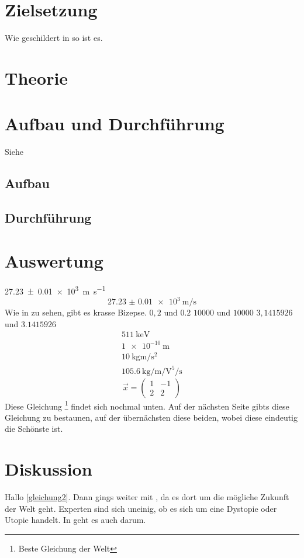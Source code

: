 \maketitle
\tableofcontents
\newpage

\section{Zielsetzung}
Wie geschildert in \cite{anleitung} so ist es.

\section{Theorie}
\section{Aufbau und Durchführung}
  Siehe
  \subsection{Aufbau}
  \subsection{Durchführung}
\newpage

\section{Auswertung}
\SI{27.23(1)e3}{\meter\per\second}
\begin{equation}
  \SI{27.23(1)e3}{\meter\per\second}
\end{equation}
Wie in \cite[4]{hallo} zu sehen, gibt es krasse Bizepse.
$0,2$ und $\num{0,2}$
$10000$ und $\num{10000}$
$3,1415926$ und $\num{3,1415926}$
\begin{gather}
  \SI{511}{\kilo\electronvolt} \\
  \SI{1e-10}{\metre} \\
  \SI{10}{\kilo\gram\meter\per\second\squared} \\
  \SI{105.6}{\kilo\gram\per\meter\per\volt\tothe{5}\per\second}
\end{gather}
\begin{equation}
  \vec{x} = \begin{pmatrix}
  1 & -1 \\
  2 & 2
  \end{pmatrix}
  \label{gleichung2}
\end{equation}
Diese Gleichung \footnote{Beste Gleichung der Welt} findet sich nochmal unten.
Auf der nächsten Seite gibts diese Gleichung zu bestaunen, auf der übernächsten diese beiden,
wobei diese eindeutig die Schönste ist.
\newpage
\section{Diskussion}
Hallo \eqref{gleichung2}. Dann gings weiter mit \cite{buch}, da es dort um die mögliche Zukunft der Welt geht. Experten sind sich
uneinig, ob es sich um eine Dystopie oder Utopie handelt. In \cite{kent} geht es auch darum.
\newpage
\nocite{*}
\printbibliography
